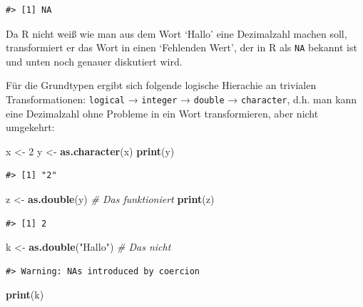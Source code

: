 \documentclass[]{tufte-book}
\newenvironment{Shaded}{}{}
\newcommand{\KeywordTok}[1]{\textcolor[rgb]{0.00,0.44,0.13}{\textbf{#1}}}
\newcommand{\DecValTok}[1]{\textcolor[rgb]{0.25,0.63,0.44}{#1}}
\newcommand{\StringTok}[1]{\textcolor[rgb]{0.25,0.44,0.63}{#1}}
\newcommand{\CommentTok}[1]{\textcolor[rgb]{0.38,0.63,0.69}{\textit{#1}}}
\newcommand{\NormalTok}[1]{#1}
\begin{document}
\begin{verbatim}
#> [1] NA
\end{verbatim}

Da R nicht weiß wie man aus dem Wort `Hallo' eine Dezimalzahl machen
soll, transformiert er das Wort in einen `Fehlenden Wert', der in R als
\texttt{NA} bekannt ist und unten noch genauer diskutiert wird.

Für die Grundtypen ergibt sich folgende logische Hierachie an trivialen
Transformationen: \texttt{logical} → \texttt{integer} → \texttt{double}
→ \texttt{character}, d.h. man kann eine Dezimalzahl ohne Probleme in
ein Wort transformieren, aber nicht umgekehrt:

\begin{Shaded}
\begin{Highlighting}[]
\NormalTok{x <-}\StringTok{ }\DecValTok{2}
\NormalTok{y <-}\StringTok{ }\KeywordTok{as.character}\NormalTok{(x)}
\KeywordTok{print}\NormalTok{(y)}
\end{Highlighting}
\end{Shaded}

\begin{verbatim}
#> [1] "2"
\end{verbatim}

\begin{Shaded}
\begin{Highlighting}[]
\NormalTok{z <-}\StringTok{ }\KeywordTok{as.double}\NormalTok{(y)  }\CommentTok{# Das funktioniert}
\KeywordTok{print}\NormalTok{(z)}
\end{Highlighting}
\end{Shaded}

\begin{verbatim}
#> [1] 2
\end{verbatim}

\begin{Shaded}
\begin{Highlighting}[]
\NormalTok{k <-}\StringTok{ }\KeywordTok{as.double}\NormalTok{(}\StringTok{"Hallo"}\NormalTok{)  }\CommentTok{# Das nicht}
\end{Highlighting}
\end{Shaded}

\begin{verbatim}
#> Warning: NAs introduced by coercion
\end{verbatim}

\begin{Shaded}
\begin{Highlighting}[]
\KeywordTok{print}\NormalTok{(k)}
\end{Highlighting}
\end{Shaded}
\end{document}
